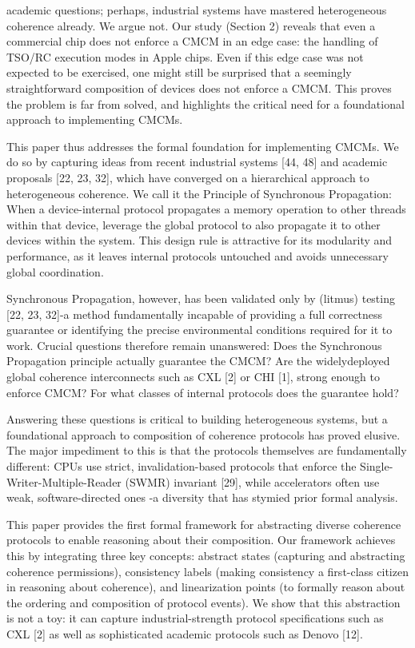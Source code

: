 \documentclass[10pt]{article}
\begin{document}
academic questions; perhaps, industrial systems have mastered heterogeneous coherence already. We argue not. Our study (Section 2) reveals that even a commercial chip does not enforce a CMCM in an edge case: the handling of TSO/RC execution modes in Apple chips. Even if this edge case was not expected to be exercised, one might still be surprised that a seemingly straightforward composition of devices does not enforce a CMCM. This proves the problem is far from solved, and highlights the critical need for a foundational approach to implementing CMCMs.

This paper thus addresses the formal foundation for implementing CMCMs. We do so by capturing ideas from recent industrial systems [44, 48] and academic proposals [22, 23, 32], which have converged on a hierarchical approach to heterogeneous coherence. We call it the Principle of Synchronous Propagation: When a device-internal protocol propagates a memory operation to other threads within that device, leverage the global protocol to also propagate it to other devices within the system. This design rule is attractive for its modularity and performance, as it leaves internal protocols untouched and avoids unnecessary global coordination.

Synchronous Propagation, however, has been validated only by (litmus) testing [22, 23, 32]-a method fundamentally incapable of providing a full correctness guarantee or identifying the precise environmental conditions required for it to work. Crucial questions therefore remain unanswered: Does the Synchronous Propagation principle actually guarantee the CMCM? Are the widelydeployed global coherence interconnects such as CXL [2] or CHI [1], strong enough to enforce CMCM? For what classes of internal protocols does the guarantee hold?

Answering these questions is critical to building heterogeneous systems, but a foundational approach to composition of coherence protocols has proved elusive. The major impediment to this is that the protocols themselves are fundamentally different: CPUs use strict, invalidation-based protocols that enforce the Single-Writer-Multiple-Reader (SWMR) invariant [29], while accelerators often use weak, software-directed ones -a diversity that has stymied prior formal analysis.

This paper provides the first formal framework for abstracting diverse coherence protocols to enable reasoning about their composition. Our framework achieves this by integrating three key concepts: abstract states (capturing and abstracting coherence permissions), consistency labels (making consistency a first-class citizen in reasoning about coherence), and linearization points (to formally reason about the ordering and composition of protocol events). We show that this abstraction is not a toy: it can capture industrial-strength protocol specifications such as CXL [2] as well as sophisticated academic protocols such as Denovo [12].
\end{document}
